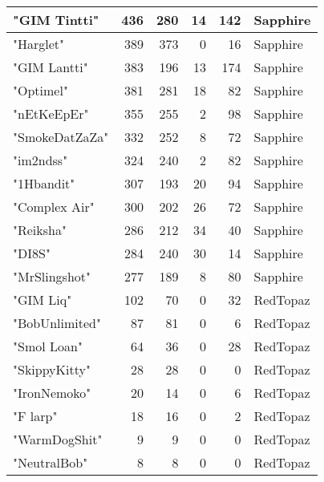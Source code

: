 \documentclass{article}
\begin{document}
\begin{table}[htbp]
\begin{tabular}{|l|r|r|r|r|l|}
"GIM Tintti" & 436 & 280 & 14 & 142 & Sapphire \\ \hline
"Harglet" & 389 & 373 & 0 & 16 & Sapphire \\ \hline
"GIM Lantti" & 383 & 196 & 13 & 174 & Sapphire \\ \hline
"Optimel" & 381 & 281 & 18 & 82 & Sapphire \\ \hline
"nEtKeEpEr" & 355 & 255 & 2 & 98 & Sapphire \\ \hline
"SmokeDatZaZa" & 332 & 252 & 8 & 72 & Sapphire \\ \hline
"im2ndss" & 324 & 240 & 2 & 82 & Sapphire \\ \hline
"1Hbandit" & 307 & 193 & 20 & 94 & Sapphire \\ \hline
"Complex Air" & 300 & 202 & 26 & 72 & Sapphire \\ \hline
"Reiksha" & 286 & 212 & 34 & 40 & Sapphire \\ \hline
"DI8S" & 284 & 240 & 30 & 14 & Sapphire \\ \hline
"MrSlingshot" & 277 & 189 & 8 & 80 & Sapphire \\ \hline
"GIM Liq" & 102 & 70 & 0 & 32 & RedTopaz \\ \hline
"BobUnlimited" & 87 & 81 & 0 & 6 & RedTopaz \\ \hline
"Smol Loan" & 64 & 36 & 0 & 28 & RedTopaz \\ \hline
"SkippyKitty" & 28 & 28 & 0 & 0 & RedTopaz \\ \hline
"IronNemoko" & 20 & 14 & 0 & 6 & RedTopaz \\ \hline
"F larp" & 18 & 16 & 0 & 2 & RedTopaz \\ \hline
"WarmDogShit" & 9 & 9 & 0 & 0 & RedTopaz \\ \hline
"NeutralBob" & 8 & 8 & 0 & 0 & RedTopaz \\ \hline
\end{tabular}
\end{table}
\end{document}
